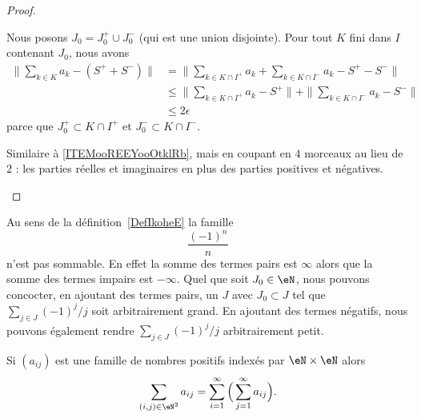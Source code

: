 \begin{proof}
\begin{subproof}
    Nous posons \( J_0=J_0^+\cup J_0^-\) (qui est une union disjointe). Pour tout \( K\) fini dans \( I\) contenant \( J_0\), nous avons
        \begin{subequations}
            \begin{align}
                \| \sum_{k\in K}a_k-(S^++S^-) \|&=\| \sum_{k\in K\cap I^+}a_k+\sum_{k\in K\cap I^-}a_k-S^+-S^- \|\\
                &\leq\| \sum_{k\in K\cap I^+}a_k-S^+ \|+\| \sum_{k\in K\cap I^-}a_k-S^- \|\\
                &\leq 2\epsilon
            \end{align}
        \end{subequations}
        parce que \( J_0^+\subset K\cap I^+\) et \( J_0^-\subset K\cap I^-\).

        Similaire à \ref{ITEMooREEYooOtklRb}, mais en coupant en $4$ morceaux au lieu de \( 2\) : les parties réelles et imaginaires en plus des parties positives et négatives.
    \end{subproof}
\end{proof}

\begin{example}     \label{EXooULLXooTDFYqf}
	Au sens de la définition~\ref{DefIkoheE} la famille
	\begin{equation}
		\frac{ (-1)^n }{ n }
	\end{equation}
	n'est pas sommable. En effet la somme des termes pairs est \( \infty\) alors que la somme des termes impairs est \( -\infty\). Quel que soit \( J_0\in \eN\), nous pouvons concocter, en ajoutant des termes pairs, un \( J\) avec \( J_0\subset J\) tel que \( \sum_{j\in J}(-1)^j/j\) soit arbitrairement grand. En ajoutant des termes négatifs, nous pouvons également rendre \( \sum_{j\in J}(-1)^j/j\) arbitrairement petit.
\end{example}

\begin{proposition} \label{PropVQCooYiWTs}
	Si \( (a_{ij})\) est une famille de nombres positifs indexés par \( \eN\times \eN\) alors
	\begin{equation}
        \sum_{(i,j)\in \eN^2}a_{ij}=\sum_{i=1}^{\infty}\Big( \sum_{j=1}^{\infty}a_{ij} \Big).
	\end{equation}
\end{proposition}

